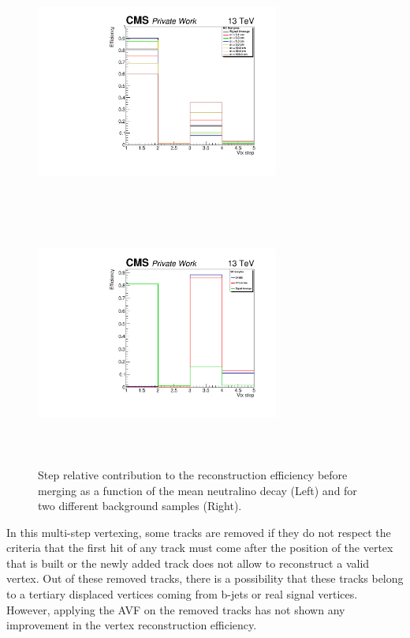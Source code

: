 \documentclass{cernatlasnote}
\begin{document}
\begin{figure}[ht]
\centering
\includegraphics[height=8cm, width=8cm, trim= 0cm 0cm 0cm 0cm,clip]{images/VTXEff/VtxStepEffi_Svsctau.pdf}\includegraphics[height=8cm, width=8cm, trim= 0cm 0cm 0cm 0cm,clip]{images/VTXEff/VtxStepEffi_SvsBKG.pdf}
\caption{\label{fig:StepEffi} Step relative contribution to the reconstruction efficiency before merging as a function of the mean neutralino decay (Left) and for two different background samples (Right). }
\end{figure}   

In this multi-step vertexing, some tracks are removed if they do not respect the criteria that the first hit of any track must come after the position of the vertex that is built or the newly added track does not allow to reconstruct a valid vertex. Out of these removed tracks, there is a possibility that these tracks belong to a tertiary displaced vertices coming from b-jets or real signal vertices. However, applying the AVF on the removed tracks has not shown any improvement in the vertex reconstruction efficiency.
    
\end{document}
